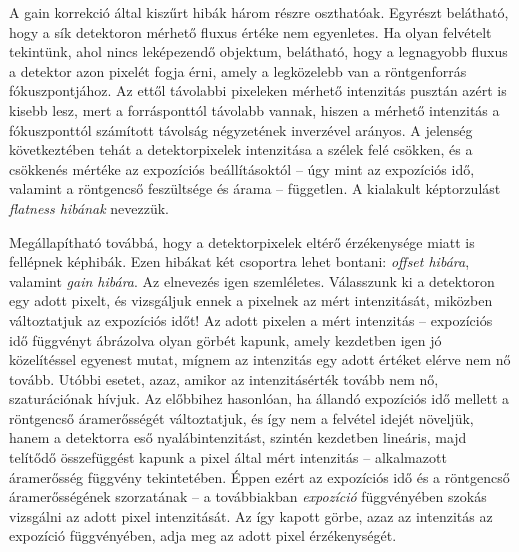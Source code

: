 \documentclass[a4paper,12pt,twoside]{article}
\begin{document}
A gain korrekció által kiszűrt hibák három részre oszthatóak. Egyrészt belátható, hogy a sík detektoron mérhető fluxus értéke nem egyenletes. Ha olyan felvételt tekintünk, ahol nincs leképezendő objektum, belátható, hogy a legnagyobb fluxus a detektor azon pixelét fogja érni, amely a legközelebb van a röntgenforrás fókuszpontjához. Az ettől távolabbi pixeleken mérhető intenzitás pusztán azért is kisebb lesz, mert a forrásponttól távolabb vannak, hiszen a mérhető intenzitás a fókuszponttól számított távolság négyzetének inverzével arányos. A jelenség következtében tehát a detektorpixelek intenzitása a szélek felé csökken, és a csökkenés mértéke az expozíciós beállításoktól -- úgy mint az expozíciós idő, valamint a röntgencső feszültsége és árama -- független. A kialakult képtorzulást \emph{flatness hibának} nevezzük.

Megállapítható továbbá, hogy a detektorpixelek eltérő érzékenysége miatt is fellépnek képhibák. Ezen hibákat két csoportra lehet bontani: \emph{offset hibára}, valamint \emph{gain hibára}. Az elnevezés igen szemléletes. Válasszunk ki a detektoron egy adott pixelt, és vizsgáljuk ennek a pixelnek az mért intenzitását, miközben változtatjuk az expozíciós időt! Az adott pixelen a mért intenzitás -- expozíciós idő függvényt ábrázolva olyan görbét kapunk, amely kezdetben igen jó közelítéssel egyenest mutat, mígnem az intenzitás egy adott értéket elérve nem nő tovább. Utóbbi esetet, azaz, amikor az intenzitásérték tovább nem nő, szaturációnak hívjuk. Az előbbihez hasonlóan, ha állandó expozíciós idő mellett a röntgencső áramerősségét változtatjuk, és így nem a felvétel idejét növeljük, hanem a detektorra eső nyalábintenzitást, szintén kezdetben lineáris, majd telítődő összefüggést kapunk a pixel által mért intenzitás -- alkalmazott áramerősség függvény tekintetében. Éppen ezért az expozíciós idő és a röntgencső áramerősségének szorzatának -- a továbbiakban \emph{expozíció} függvényében szokás vizsgálni az adott pixel intenzitását. Az így kapott görbe, azaz az intenzitás az expozíció függvényében, adja meg az adott pixel érzékenységét.
\end{document}
